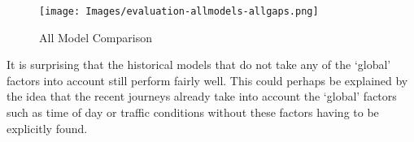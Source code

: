 \begin{figure}[H]
\begin{center}
    \texttt{[image: Images/evaluation-allmodels-allgaps.png]}
    \caption{All Model Comparison}
    \label{fig:all-model-comparison}
\end{center}
\end{figure}

It is surprising that the historical models that do not take any of the `global' factors into account still perform fairly well. This could perhaps be explained by the idea that the recent journeys already take into account the `global' factors such as time of day or traffic conditions without these factors having to be explicitly found.

\clearpage